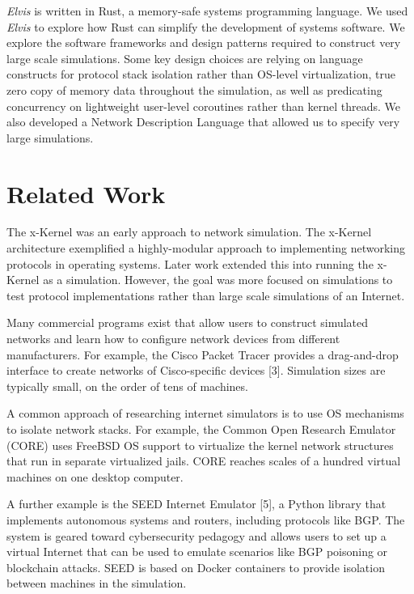 \documentclass[journal]{IEEEtran} %
\newcommand{\elvis}{\textit{Elvis}}
\begin{document}
\elvis{} is written in Rust\cite{rust}, a memory-safe systems programming language. We used \elvis{} to explore how Rust can simplify the development of systems software. We explore the software frameworks and design patterns required to construct very large scale simulations. Some key design choices are relying on language constructs for protocol stack isolation rather than OS-level virtualization, true zero copy of memory data throughout the simulation, as well as predicating concurrency on lightweight user-level coroutines rather than kernel threads. We also developed a Network Description Language that allowed us to specify very large simulations.

\section{Related Work}

The x-Kernel was an early approach to network simulation\cite{xk}. The x-Kernel architecture exemplified a highly-modular approach to implementing networking protocols in operating systems. Later work extended this into running the x-Kernel as a simulation. However, the goal was more focused on simulations to test protocol implementations rather than large scale simulations of an Internet.

Many commercial programs exist that allow users to construct simulated networks and learn how to configure network devices from different manufacturers. For example, the Cisco Packet Tracer provides a drag-and-drop interface to create networks of Cisco-specific devices [3]. Simulation sizes are typically small, on the order of tens of machines.

A common approach of researching internet simulators is to use OS mechanisms to isolate network stacks. For example, the Common Open Research Emulator (CORE) \cite{core} uses FreeBSD OS support to virtualize the kernel network structures that run in separate virtualized jails.  CORE reaches scales of a hundred virtual machines on one desktop computer.

A further example is the SEED Internet Emulator [5],  a Python library that implements autonomous systems and routers, including protocols like BGP. The system is geared toward cybersecurity pedagogy and allows users to set up a virtual Internet that can be used to emulate scenarios like BGP poisoning or blockchain attacks. SEED is based on Docker\cite{docker} containers to provide isolation between machines in the simulation.
\end{document}
